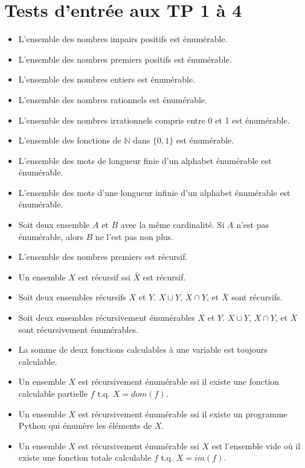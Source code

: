 \chapter{Tests d'entrée aux TP 1 à 4}

\begin{itemize}
\item L'ensemble des nombres impairs positifs est énumérable. 
\item L'ensemble des nombres premiers positifs est énumérable. 
\item L'ensemble des nombres entiers est énumérable. 
\item L'ensemble des nombres rationnels est énumérable. 
\item L'ensemble des nombres irrationnels compris entre 0 et 1 est énumérable. 
\item L'ensemble des fonctions de $\mathbb{N}$ dans $\{0, 1\}$ est énumérable. 
\item L'ensemble des mots de longueur finie d'un alphabet énumérable est énumérable. 
\item L'ensemble des mots d'une longueur infinie d'un alphabet énumérable est énumérable. 
\item Soit deux ensemble $A$ et $B$ avec la même cardinalité. Si $A$ n'est pas énumérable, alors $B$ ne l'est pas non plus. 

\item L'ensemble des nombres premiers est récursif. 
\item Un ensemble $X$ est récursif ssi $\bar{X}$ est récursif. 
\item Soit deux ensembles récursifs $X$ et $Y$. $X \cup Y$, $X \cap Y$, et $\bar{X}$ sont récursifs. 
\item Soit deux ensembles récursivement énumérables $X$ et $Y$. $X \cup Y$, $X \cap Y$, et $\bar{X}$ sont récursivement énumérables. 
\item La somme de deux fonctions calculables à une variable est toujours calculable. 
\item Un ensemble $X$ est récursivement énumérable ssi il existe une fonction calculable partielle $f$ t.q. $X = dom(f)$. 
\item Un ensemble $X$ est récursivement énumérable ssi il existe un programme Python qui énumère les éléments de $X$. 
\item Un ensemble $X$ est récursivement énumérable ssi $X$ est l'ensemble vide où il existe une fonction totale calculable $f$ t.q. $X = im(f)$. 


\end{itemize}
